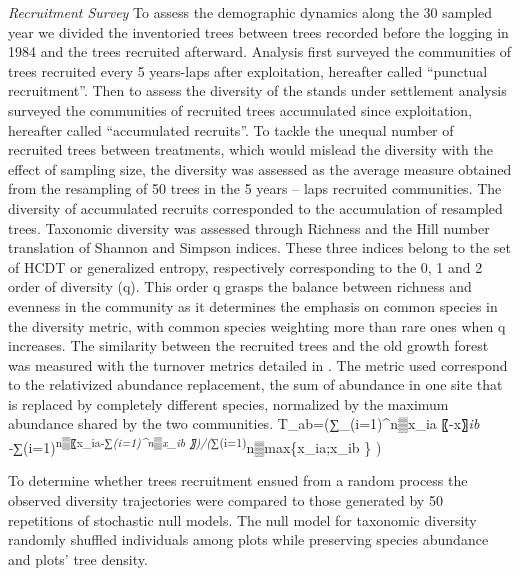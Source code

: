 \documentclass[fleqn,10pt]{ArtEcoFoG} %
\begin{document}
\emph{Recruitment Survey} To assess the demographic dynamics along the
30 sampled year we divided the inventoried trees between trees recorded
before the logging in 1984 and the trees recruited afterward. Analysis
first surveyed the communities of trees recruited every 5 years-laps
after exploitation, hereafter called ``punctual recruitment''. Then to
assess the diversity of the stands under settlement analysis surveyed
the communities of recruited trees accumulated since exploitation,
hereafter called ``accumulated recruits''. To tackle the unequal number
of recruited trees between treatments, which would mislead the diversity
with the effect of sampling size, the diversity was assessed as the
average measure obtained from the resampling of 50 trees in the 5 years
-- laps recruited communities. The diversity of accumulated recruits
corresponded to the accumulation of resampled trees. Taxonomic diversity
was assessed through Richness and the Hill number translation of Shannon
and Simpson indices. These three indices belong to the set of HCDT or
generalized entropy, respectively corresponding to the 0, 1 and 2 order
of diversity (q). This order q grasps the balance between richness and
evenness in the community as it determines the emphasis on common
species in the diversity metric, with common species weighting more than
rare ones when q increases. The similarity between the recruited trees
and the old growth forest was measured with the turnover metrics
detailed in \citet{Podani2013a}. The metric used correspond to the
relativized abundance replacement, the sum of abundance in one site that
is replaced by completely different species, normalized by the maximum
abundance shared by the two communities.
T\_ab=(∑\_(i=1)\^{}n▒\textbar{}x\_ia 〖-x〗\emph{ib \textbar{}
-\textbar{}∑}(i=1)\textsuperscript{n▒〖x\_ia-∑\emph{(i=1)\^{}n▒x\_ib
〗\textbar{})/(∑}(i=1)}n▒max\{x\_ia;x\_ib \} )

To determine whether trees recruitment ensued from a random process the
observed diversity trajectories were compared to those generated by 50
repetitions of stochastic null models. The null model for taxonomic
diversity randomly shuffled individuals among plots while preserving
species abundance and plots' tree density.





\end{document}
